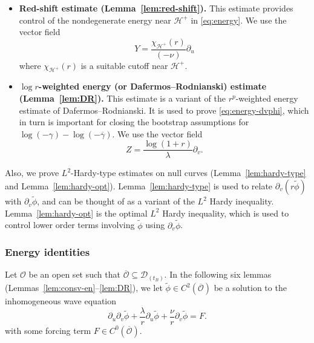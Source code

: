 \documentclass[10pt, reqno]{amsart}
\theoremstyle{definition}
\theoremstyle{remark}
\theoremstyle{conjecture}
\numberwithin{equation}{section}
\newcommand{\rd}{\partial}
\newcommand{\0}{\emptyset}
\newcommand{\gmm}{\gamma}
\newcommand{\lmb}{\lambda}
\newcommand{\calD}{\mathcal D}
\newcommand{\calH}{\mathcal H}
\newcommand{\calO}{\mathcal O}
\newcommand{\dur}{\nu}
\newcommand{\dvr}{\lmb}
\newcommand{\EH}{\calH^{+}}
\newcommand{\phibg}{\overline{\phi}}				%
\newcommand{\gmmbg}{\overline{\gmm}}					%
\newcommand{\phidf}{\widetilde{\phi}}				%
\begin{document}
\begin{itemize}
\item {\bf Red-shift estimate (Lemma~\ref{lem:red-shift}).}
This estimate provides control of the nondegenerate energy near $\EH$ in \eqref{eq:energy}. We use the vector field
\begin{equation} \label{eq:vf-Y}
	Y = \frac{\chi_{\EH}(r)}{(-\dur)} \rd_{u}
\end{equation}
where $\chi_{\EH}(r)$ is a suitable cutoff near $\EH$.

\item {\bf $\log r$-weighted energy (or Dafermos--Rodnianski) estimate (Lemma~\ref{lem:DR}).} This estimate is a variant of the $r^{p}$-weighted energy estimate of Dafermos--Rodnianski. It is used to prove \eqref{eq:energy-dvphi}, which in turn is important for closing the bootstrap assumptions for $\log (-\gmm) - \log (-\gmmbg)$. We use the vector field
\begin{equation} \label{eq:vf-Z}
	Z = \frac{\log(1+r)}{\dvr} \rd_{v} .
\end{equation}
\end{itemize}

Also, we prove $L^{2}$-Hardy-type estimates on null curves (Lemma~\ref{lem:hardy-type} and Lemma~\ref{lem:hardy-opt}). Lemma~\ref{lem:hardy-type} is used to relate $\rd_{v} (r \phidf)$ with $\rd_{v} \phidf$, and can be thought of as a variant of the $L^{2}$ Hardy inequality. 
Lemma~\ref{lem:hardy-opt} is the optimal $L^{2}$ Hardy inequality, which is used to control lower order terms involving $\phidf$ using $\rd_{v} \phidf$.

\subsubsection*{Energy identities}
Let $\calO$ be an open set such that $\overline{\calO} \subseteq \calD_{(t_{B})}$. In the following six lemmas (Lemmas~\ref{lem:consv-en}--\ref{lem:DR}), we let $\phidf \in C^{2}(\overline{\calO})$ be a solution to the inhomogeneous wave equation
\begin{equation} \label{eq:wave-inhom}
	\rd_{u} \rd_{v} \phidf + \frac{\dvr}{r} \rd_{u} \phidf + \frac{\dur}{r} \rd_{v} \phidf = F.
\end{equation}
with some forcing term $F \in C^{0}(\overline{\calO})$.
\end{document}
